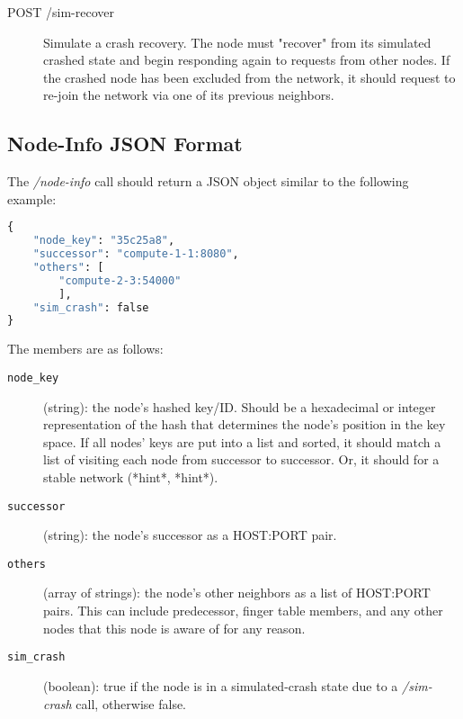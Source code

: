 \documentclass[]{article}
\begin{document}
\begin{description}

    \item[POST /sim-recover]

        Simulate a crash recovery.
        The node must "recover" from its simulated crashed state and begin
        responding again to requests from other nodes.
        If the crashed node has been excluded from the network,
        it should request to re-join the network via one of its previous neighbors.

\end{description}

\subsection{Node-Info JSON Format}
\label{node_info_json_format}

The \textit{/node-info} call should return a JSON object similar to the following example:

\begin{lstlisting}[language=Python]
{
    "node_key": "35c25a8",
    "successor": "compute-1-1:8080",
    "others": [
        "compute-2-3:54000"
        ],
    "sim_crash": false
}
\end{lstlisting}

The members are as follows:

\begin{description}


    \item[\texttt{node\_key}] (string): the node's hashed key/ID.
        Should be a hexadecimal or integer representation of the hash
        that determines the node's position in the key space.
        If all nodes' keys are put into a list and sorted,
        it should match a list of visiting each node from successor to successor.
        Or, it should for a stable network {(*hint*, *hint*)}.

    \item[\texttt{successor}] (string): the node's successor as a HOST:PORT pair.

    \item[\texttt{others}] (array of strings): the node's other neighbors as a list of HOST:PORT pairs.
        This can include predecessor, finger table members, and any other
        nodes that this node is aware of for any reason.

    \item[\texttt{sim\_crash}] (boolean): true if the node is in a simulated-crash state
        due to a \textit{/sim-crash} call,
        otherwise false.

\end{description}
\end{document}
